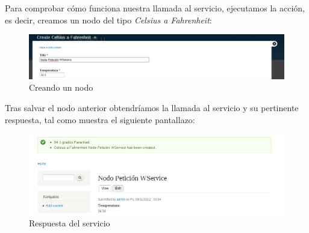 Para comprobar cómo funciona nuestra llamada al servicio, ejecutamos la acción, es decir, creamos un nodo del 
tipo \textit{Celsius a Fahrenheit}:

\begin{figure}
  \centering
    \includegraphics[width=1\textwidth]{Assets/Soap/Imagenes/crear_nodo.png}
  \caption{Creando un nodo}
\end{figure}

Tras salvar el nodo anterior obtendríamos la llamada al servicio y su pertinente respuesta, tal como muestra 
el siguiente pantallazo:

\begin{figure}
  \centering
    \includegraphics[width=1\textwidth]{Assets/Soap/Imagenes/resultado_crear_nodo.png}
  \caption{Respuesta del servicio}
\end{figure}




